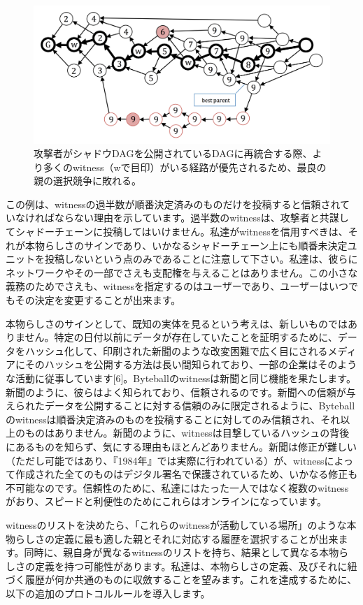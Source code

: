 \documentclass[a4paper, dvipdfmx]{jsarticle}
\begin{document}
\begin{figure}[htbp]
  \includegraphics[width=\linewidth]{fig4.png}
  \caption{攻撃者がシャドウDAGを公開されているDAGに再統合する際、より多くのwitness（wで目印）がいる経路が優先されるため、最良の親の選択競争に敗れる。}
\end{figure}

この例は、witnessの過半数が順番決定済みのものだけを投稿すると信頼されていなければならない理由を示しています。過半数のwitnessは、攻撃者と共謀してシャドーチェーンに投稿してはいけません。私達がwitnessを信用すべきは、それが本物らしさのサインであり、いかなるシャドーチェーン上にも順番未決定ユニットを投稿しないという点のみであることに注意して下さい。私達は、彼らにネットワークやその一部でさえも支配権を与えることはありません。この小さな義務のためでさえも、witnessを指定するのはユーザーであり、ユーザーはいつでもその決定を変更することが出来ます。

本物らしさのサインとして、既知の実体を見るという考えは、新しいものではありません。特定の日付以前にデータが存在していたことを証明するために、データをハッシュ化して、印刷された新聞のような改変困難で広く目にされるメディアにそのハッシュを公開する方法は長い間知られており、一部の企業はそのような活動に従事しています[6]。Byteballのwitnessは新聞と同じ機能を果たします。新聞のように、彼らはよく知られており、信頼されるのです。新聞への信頼が与えられたデータを公開することに対する信頼のみに限定されるように、Byteballのwitnessは順番決定済みのものを投稿することに対してのみ信頼され、それ以上のものはありません。新聞のように、witnessは目撃しているハッシュの背後にあるものを知らず、気にする理由もほとんどありません。新聞は修正が難しい（ただし可能ではあり、『1984年』では実際に行われている）が、witnessによって作成された全てのものはデジタル署名で保護されているため、いかなる修正も不可能なのです。信頼性のために、私達にはたった一人ではなく複数のwitnessがおり、スピードと利便性のためにこれらはオンラインになっています。

witnessのリストを決めたら、「これらのwitnessが活動している場所」のような本物らしさの定義に最も適した親とそれに対応する履歴を選択することが出来ます。同時に、親自身が異なるwitnessのリストを持ち、結果として異なる本物らしさの定義を持つ可能性があります。私達は、本物らしさの定義、及びそれに紐づく履歴が何か共通のものに収斂することを望みます。これを達成するために、以下の追加のプロトコルルールを導入します。
\end{document}
